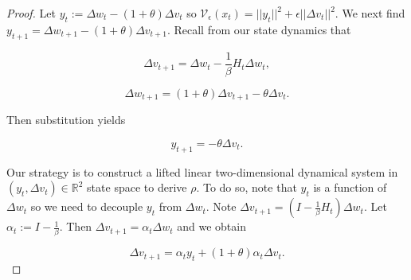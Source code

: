 \documentclass[twoside,11pt]{article}
\begin{document}
\begin{proof}
Let $y_t := \Delta w_t - (1+\theta)\Delta v_t$ so $\mathcal{V}_{\epsilon}(x_t) = ||y_t||^2 + \epsilon||\Delta v_t||^2$. We next find $y_{t+1} = \Delta w_{t+1} - (1+\theta)\Delta v_{t+1}$. Recall from our state dynamics that

\begin{equation}
\Delta v_{t+1} = \Delta w_t - \frac{1}{\beta}H_t\Delta w_t,
\end{equation}

\begin{equation}
\Delta w_{t+1} = (1+\theta)\Delta v_{t+1}-\theta\Delta v_t.
\end{equation}

\noindent
Then substitution yields

\begin{equation}
y_{t+1} = -\theta\Delta v_t.
\end{equation}

\noindent
Our strategy is to construct a lifted linear two-dimensional dynamical system in $(y_t, \Delta v_t) \in \mathbb{R}^2$ state space to derive $\rho$. To do so, note that $y_t$ is a function of $\Delta w_t$ so we need to decouple $y_t$ from $\Delta w_t$. Note $\Delta v_{t+1} = (I - \frac{1}{\beta}H_t)\Delta w_t$. Let $\alpha_t := I - \frac{1}{\beta}$. Then $\Delta v_{t+1} = \alpha_t \Delta w_t$ and we obtain

\begin{equation}
\Delta v_{t+1} = \alpha_t y_t + (1+\theta)\alpha_t \Delta v_t.
\end{equation}


\end{proof}
\end{document}
